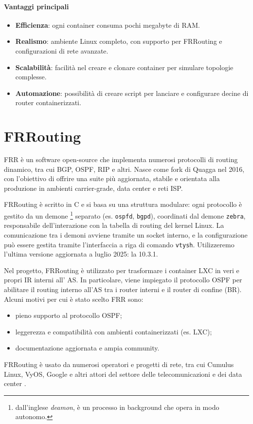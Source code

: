 \documentclass[12pt,a4paper,twoside]{book}
\begin{document}
\paragraph{Vantaggi principali}
\begin{itemize}
    \item \textbf{Efficienza}: ogni container consuma pochi megabyte di RAM.
    \item \textbf{Realismo}: ambiente Linux completo, con supporto per FRRouting e configurazioni di rete avanzate.
    \item \textbf{Scalabilità}: facilità nel creare e clonare container per simulare topologie complesse.
    \item \textbf{Automazione}: possibilità di creare script per lanciare e configurare decine di router containerizzati.
\end{itemize}

\section{FRRouting}
\ac{FRR} è un software open-source che implementa numerosi protocolli di routing dinamico, tra cui \ac{BGP}, \ac{OSPF}, \ac{RIP} e altri. Nasce come fork di Quagga nel 2016, con l'obiettivo di offrire una suite più aggiornata, stabile e orientata alla produzione in ambienti carrier-grade, data center e reti ISP. \cite{frr-docs} 

FRRouting è scritto in C e si basa su una struttura modulare: ogni protocollo è gestito da un demone \footnote{dall'inglese \textit{deamon}, è un processo in background che opera in modo autonomo.} separato (es. \texttt{ospfd}, \texttt{bgpd}), coordinati dal demone \texttt{zebra}, responsabile dell'interazione con la tabella di routing del kernel Linux. La comunicazione tra i demoni avviene tramite un socket interno, e la configurazione può essere gestita tramite l'interfaccia a riga di comando \texttt{vtysh}.
Utilizzeremo l'ultima versione aggiornata a luglio 2025: la 10.3.1.

Nel progetto, FRRouting è utilizzato per trasformare i container LXC in veri e propri \ac{IR} interni all' \ac{AS}. In particolare, viene impiegato il protocollo OSPF per abilitare il routing interno all’\ac{AS} tra i router interni e il router di confine (\ac{BR}). Alcuni motivi per cui è stato scelto \ac{FRR} sono:
\begin{itemize}
    \item pieno supporto al protocollo OSPF;
    \item leggerezza e compatibilità con ambienti containerizzati (es. LXC);
    \item documentazione aggiornata e ampia community.
\end{itemize}
FRRouting è usato da numerosi operatori e progetti di rete, tra cui Cumulus Linux, VyOS, Google e altri attori del settore delle telecomunicazioni e dei data center \cite{openfrr2024}.
\end{document}
